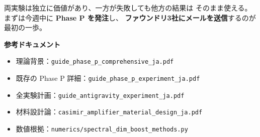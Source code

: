 \documentclass[11pt,a4paper]{article}
\begin{document}
両実験は独立に価値があり、一方が失敗しても他方の結果は
そのまま使える。まずは今週中に \textbf{Phase P を発注}し、
\textbf{ファウンドリ3社にメールを送信}するのが最初の一歩。

\vspace{1em}
\noindent\textbf{参考ドキュメント}
\begin{itemize}[leftmargin=2em,nosep]
  \item 理論背景：\texttt{guide\_phase\_p\_comprehensive\_ja.pdf}
  \item 既存の Phase P 詳細：\texttt{guide\_phase\_p\_experiment\_ja.pdf}
  \item 全実験計画：\texttt{guide\_antigravity\_experiment\_ja.pdf}
  \item 材料設計論：\texttt{casimir\_amplifier\_material\_design\_ja.pdf}
  \item 数値根拠：\texttt{numerics/spectral\_dim\_boost\_methods.py}
\end{itemize}
\end{document}
